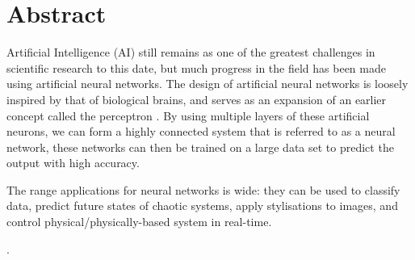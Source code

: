 \chapter*{Abstract}

Artificial Intelligence (AI) still remains as one of the greatest challenges in
scientific research to this date, but much progress in the field has been made
using artificial neural networks.
The design of artificial neural networks is loosely inspired by that of
biological brains, and serves as an expansion of an earlier concept called the
perceptron \citep{Rosenblatt:1958:Perceptron}.
By using multiple layers of these artificial neurons, we can form a highly
connected system that is referred to as a neural network,
these networks can then be trained on a large data set to predict the output
with high accuracy.

The range applications for neural networks is wide: they can be used to classify
data, predict future states of chaotic systems, apply stylisations to images,
and control physical/physically-based system in real-time.

.
